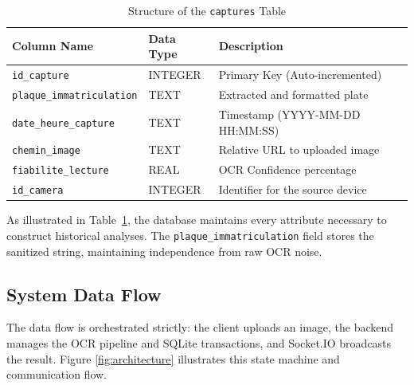 \documentclass[conference]{IEEEtran}
\begin{document}
\begin{table}[hbt!]
\caption{Structure of the \texttt{captures} Table}
\begin{center}
\begin{tabular}{|l|l|l|}
\hline
\textbf{Column Name} & \textbf{Data Type} & \textbf{Description} \\
\hline
\texttt{id\_capture} & INTEGER & Primary Key (Auto-incremented) \\
\texttt{plaque\_immatriculation} & TEXT & Extracted and formatted plate \\
\texttt{date\_heure\_capture} & TEXT & Timestamp (YYYY-MM-DD HH:MM:SS) \\
\texttt{chemin\_image} & TEXT & Relative URL to uploaded image \\
\texttt{fiabilite\_lecture} & REAL & OCR Confidence percentage \\
\texttt{id\_camera} & INTEGER & Identifier for the source device \\
\hline
\end{tabular}
\label{tab:db_schema}
\end{center}
\end{table}

As illustrated in Table~\ref{tab:db_schema}, the database maintains every attribute necessary to construct historical analyses. The \texttt{plaque\_immatriculation} field stores the sanitized string, maintaining independence from raw OCR noise.

\subsection{System Data Flow}
The data flow is orchestrated strictly: the client uploads an image, the backend manages the OCR pipeline and SQLite transactions, and Socket.IO broadcasts the result. Figure \ref{fig:architecture} illustrates this state machine and communication flow.
\end{document}
